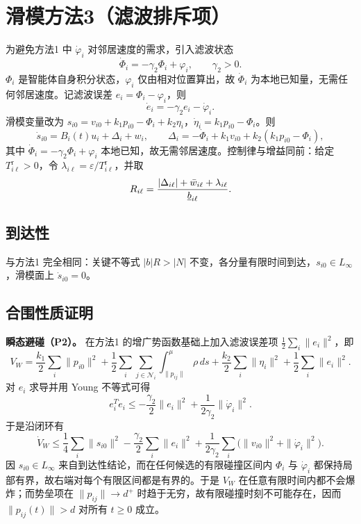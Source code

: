 \section{滑模方法3（滤波排斥项）}

为避免方法1 中 $\dot\varphi_i$ 对邻居速度的需求，引入滤波状态
\[
    \dot\Phi_i=-\gamma_2\Phi_i+\varphi_i,\qquad \gamma_2>0.
\]
$\Phi_i$ 是智能体自身积分状态，$\varphi_i$ 仅由相对位置算出，故 $\dot\Phi_i$ 为本地已知量，无需任何邻居速度。记滤波误差 $e_i=\Phi_i-\varphi_i$，则
\[
    \dot e_i=-\gamma_2 e_i-\dot\varphi_i.
\]
滑模变量改为 $s_{i0}=v_{i0}+k_1p_{i0}-\Phi_i+k_2\eta_i$，$\dot\eta_i=k_1p_{i0}-\Phi_i$。则
\[
    \dot s_{i0}=B_i(t)u_i+\Delta_i+w_i,\qquad
    \Delta_i=-\dot\Phi_i+k_1v_{i0}+k_2(k_1p_{i0}-\Phi_i),
\]
其中 $\dot\Phi_i=-\gamma_2\Phi_i+\varphi_i$ 本地已知，故无需邻居速度。控制律与增益同前：给定 $T^{\mathrm r}_{i\ell}>0$，令 $\lambda_{i\ell}=\varepsilon/T^{\mathrm r}_{i\ell}$，并取
\[
    R_{i\ell}=\frac{|\Delta_{i\ell}|+\bar w_{i\ell}+\lambda_{i\ell}}{\underline{b}_{i\ell}}.
\]

\subsection{到达性}

与方法1 完全相同：关键不等式 $|b|R>|N|$ 不变，各分量有限时间到达，$s_{i0}\in L_\infty$，滑模面上 $\dot s_{i0}=0$。

\subsection{合围性质证明}

\textbf{瞬态避碰（P2）。} 在方法1 的增广势函数基础上加入滤波误差项 $\frac12\sum_i\|e_i\|^2$，即
\[
    V_W=\frac{k_1}{2}\sum_i\|p_{i0}\|^2
    +\frac12\sum_i\sum_{j\in\mathcal N_i}\int_{\|p_{ij}\|}^{\mu}\rho\,ds
    +\frac{k_2}{2}\sum_i\|\eta_i\|^2
    +\frac12\sum_i\|e_i\|^2 .
\]
对 $e_i$ 求导并用 Young 不等式可得
\[
    e_i^T\dot e_i
    \le -\frac{\gamma_2}{2}\|e_i\|^2+\frac{1}{2\gamma_2}\|\dot\varphi_i\|^2.
\]
于是沿闭环有
\[
    \dot V_W\le \frac14\sum_i\|s_{i0}\|^2
    -\frac{\gamma_2}{2}\sum_i\|e_i\|^2
    +\frac{1}{2\gamma_2}\sum_i\bigl(\|v_{i0}\|^2+\|\dot\varphi_i\|^2\bigr).
\]
因 $s_{i0}\in L_\infty$ 来自到达性结论，而在任何候选的有限碰撞区间内 $\Phi_i$ 与 $\dot\varphi_i$ 都保持局部有界，故右端对每个有限区间都是有界的。于是 $V_W$ 在任意有限时间内都不会爆炸；而势垒项在 $\|p_{ij}\|\to d^+$ 时趋于无穷，故有限碰撞时刻不可能存在，因而 $\|p_{ij}(t)\|>d$ 对所有 $t\ge0$ 成立。

